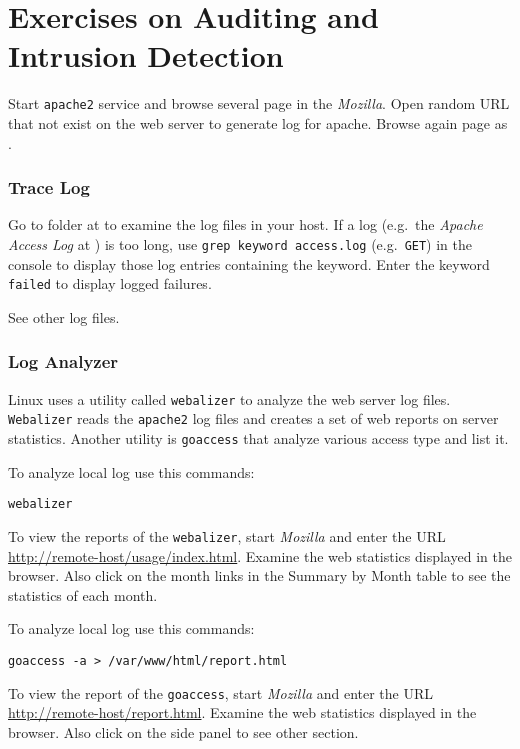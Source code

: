 \documentclass{../UTNetLab}
\begin{document}
\part{Exercises on Auditing and Intrusion Detection}
    Start \lstinline{apache2} service and browse several page in the \textit{Mozilla}.
    Open random URL that not exist on the web server to generate log for apache.
    Browse again page as .

\section{Trace Log}
    Go to  folder at  to examine the log files in your host.
    If a log (e.g.\ the \textit{Apache Access Log} at ) is too long, use \lstinline[emph={keyword}]{grep keyword access.log} (e.g.\ \texttt{GET}) in the {console} to display those log entries containing the keyword.
    Enter the keyword \texttt{failed} to display logged failures.

    See other log files.

\section{Log Analyzer}
    Linux uses a utility called \lstinline{webalizer} to analyze the web server log files.
    \lstinline{Webalizer} reads the \lstinline{apache2} log files and creates a set of web reports on server statistics.
    Another utility is \lstinline{goaccess} that analyze various access type and list it.

    To analyze local log use this commands:
    \begin{lstlisting}
webalizer
    \end{lstlisting}
    
    To view the reports of the \lstinline{webalizer}, start \textit{Mozilla} and enter the URL \url{http://remote-host/usage/index.html}.
    Examine the web statistics displayed in the browser.
    Also click on the month links in the Summary by Month table to see the statistics of each month.

    To analyze local log use this commands:
    \begin{lstlisting}
goaccess -a > /var/www/html/report.html
    \end{lstlisting}
    
    To view the report of the \lstinline{goaccess}, start \textit{Mozilla} and enter the URL \url{http://remote-host/report.html}.
    Examine the web statistics displayed in the browser.
    Also click on the side panel to see other section.
\end{document}
